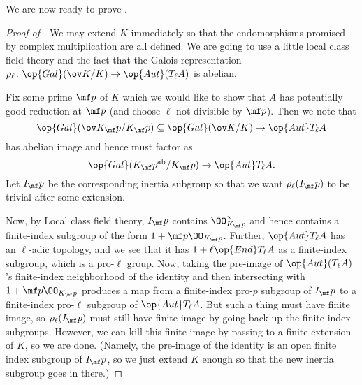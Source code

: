 \documentclass[../notes.tex]{subfiles}
\begin{document}
We are now ready to prove .
\begin{proof}[Proof of ]
	We may extend $K$ immediately so that the endomorphisms promised by complex multiplication are all defined. We are going to use a little local class field theory and the fact that the Galois representation $\rho_\ell\colon\op{Gal}(\ov K/K)\to\op{Aut}(T_\ell A)$ is abelian.
	
	Fix some prime $\mf p$ of $K$ which we would like to show that $A$ has potentially good reduction at $\mf p$ (and choose $\ell$ not divisible by $\mf p$). Then we note that
	\[\op{Gal}(\ov K_\mf p/K_\mf p)\subseteq\op{Gal}(\ov K/K)\to\op{Aut}T_\ell A\]
	has abelian image and hence must factor as
	\[\op{Gal}(K_\mf p^{\mathrm{ab}}/K_\mf p)\to\op{Aut}T_\ell A.\]
	Let $I_\mf p$ be the corresponding inertia subgroup so that we want $\rho_\ell(I_\mf p)$ to be trivial after some extension.

	Now, by Local class field theory, $I_\mf p$ contains $\OO_{K_\mf p}^\times$ and hence contains a finite-index subgroup of the form $1+\mf p\OO_{K_\mf p}$. Further, $\op{Aut}T_\ell A$ has an $\ell$-adic topology, and we see that it has $1+\ell\op{End}T_\ell A$ as a finite-index subgroup, which is a pro-$\ell$ group. Now, taking the pre-image of $\op{Aut}(T_\ell A)$'s finite-index neighborhood of the identity and then intersecting with $1+\mf p\OO_{K_\mf p}$ produces a map from a finite-index pro-$p$ subgroup of $I_\mf p$ to a finite-index pro-$\ell$ subgroup of $\op{Aut}T_\ell A$. But such a thing must have finite image, so $\rho_\ell(I_\mf p)$ must still have finite image by going back up the finite index subgroups. However, we can kill this finite image by passing to a finite extension of $K$, so we are done. (Namely, the pre-image of the identity is an open finite index subgroup of $I_\mf p$, so we just extend $K$ enough so that the new inertia subgroup goes in there.)
\end{proof}
\end{document}
